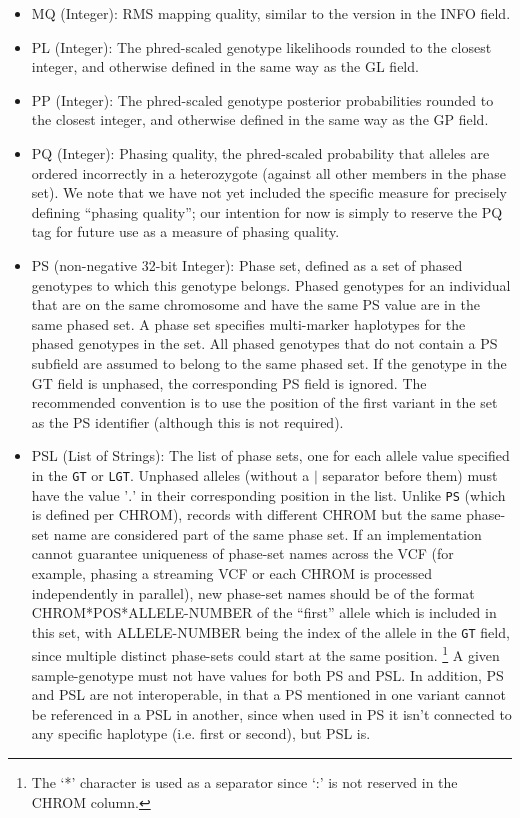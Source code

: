 \documentclass[8pt]{article}
\begin{document}
\begin{itemize}
  \item MQ (Integer): RMS mapping quality, similar to the version in the INFO field.
  \item PL (Integer): The phred-scaled genotype likelihoods rounded to the closest integer, and otherwise defined in the same way as the GL field.
  \item PP (Integer): The phred-scaled genotype posterior probabilities rounded to the closest integer, and otherwise defined in the same way as the GP field.
  \item PQ (Integer): Phasing quality, the phred-scaled probability that alleles are ordered incorrectly in a heterozygote (against all other members in the phase set).
  We note that we have not yet included the specific measure for precisely defining ``phasing quality''; our intention for now is simply to reserve the PQ tag for future use as a measure of phasing quality.
  \item PS (non-negative 32-bit Integer): Phase set, defined as a set of phased genotypes to which this genotype belongs.
  Phased genotypes for an individual that are on the same chromosome and have the same PS value are in the same phased set.
  A phase set specifies multi-marker haplotypes for the phased genotypes in the set.
  All phased genotypes that do not contain a PS subfield are assumed to belong to the same phased set.
  If the genotype in the GT field is unphased, the corresponding PS field is ignored.
  The recommended convention is to use the position of the first variant in the set as the PS identifier (although this is not required).
  \item PSL (List of Strings): The list of phase sets, one for each allele value specified in the {\tt GT} or {\tt LGT}. 
  Unphased alleles (without a $\mid$ separator before them) must have the value '$.$' in their corresponding position in the list.
  Unlike {\tt PS} (which is defined per CHROM), records with different CHROM but the same phase-set name are considered part of the same phase set.
  If an implementation cannot guarantee uniqueness of phase-set names across the VCF (for example, phasing a streaming VCF or each CHROM is processed independently in parallel), new phase-set names should be of the format CHROM*POS*ALLELE-NUMBER of the ``first'' allele which is included in this set, with ALLELE-NUMBER being the index of the allele in the {\tt GT} field, since multiple distinct phase-sets could start at the same position. \footnote{The `*' character is used as a separator since `:' is not reserved in the CHROM column.}
  A given sample-genotype must not have values for both PS and PSL.
  In addition, PS and PSL are not interoperable, in that a PS mentioned in one variant cannot be referenced in a PSL in another,  since when used in PS it isn't connected to any specific haplotype (i.e. first or second), but PSL is. 
 

\end{itemize}
\end{document}
